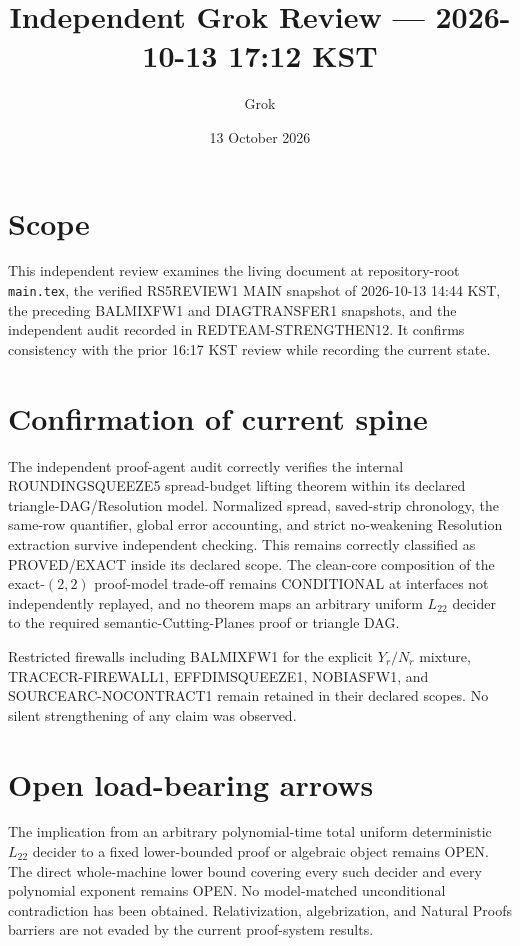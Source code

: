\documentclass[11pt]{article}
\title{Independent Grok Review --- 2026-10-13 17:12 KST}
\author{Grok}
\date{13 October 2026}
\begin{document}
\maketitle

\begin{center}
\end{center}

\section{Scope}
This independent review examines the living document at repository-root \texttt{main.tex}, the verified RS5REVIEW1 MAIN snapshot of 2026-10-13 14:44 KST, the preceding BALMIXFW1 and DIAGTRANSFER1 snapshots, and the independent audit recorded in REDTEAM-STRENGTHEN12. It confirms consistency with the prior 16:17 KST review while recording the current state.

\section{Confirmation of current spine}
The independent proof-agent audit correctly verifies the internal ROUNDINGSQUEEZE5 spread-budget lifting theorem within its declared triangle-DAG/Resolution model. Normalized spread, saved-strip chronology, the same-row quantifier, global error accounting, and strict no-weakening Resolution extraction survive independent checking. This remains correctly classified as PROVED/EXACT inside its declared scope. The clean-core composition of the exact-$(2,2)$ proof-model trade-off remains CONDITIONAL at interfaces not independently replayed, and no theorem maps an arbitrary uniform $L_{22}$ decider to the required semantic-Cutting-Planes proof or triangle DAG.

Restricted firewalls including BALMIXFW1 for the explicit $Y_r/N_r$ mixture, TRACECR-FIREWALL1, EFFDIMSQUEEZE1, NOBIASFW1, and SOURCEARC-NOCONTRACT1 remain retained in their declared scopes. No silent strengthening of any claim was observed.

\section{Open load-bearing arrows}
The implication from an arbitrary polynomial-time total uniform deterministic $L_{22}$ decider to a fixed lower-bounded proof or algebraic object remains OPEN. The direct whole-machine lower bound covering every such decider and every polynomial exponent remains OPEN. No model-matched unconditional contradiction has been obtained. Relativization, algebrization, and Natural Proofs barriers are not evaded by the current proof-system results.
\end{document}

